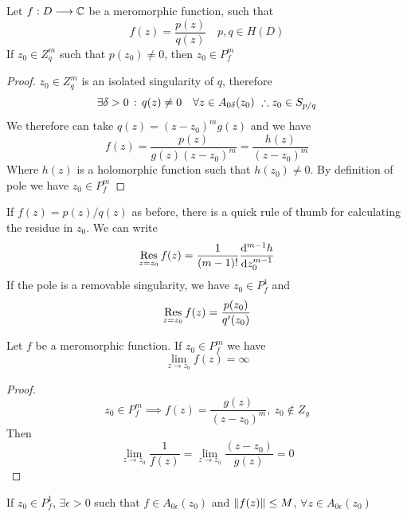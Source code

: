 \documentclass[../complete.tex]{subfiles}
\begin{document}
\begin{thm}
	Let $f:D\overset{}{\longrightarrow}\mathbb{C}$ be a meromorphic function, such that
	\begin{equation*}
		f(z)=\frac{p(z)}{q(z)}\quad p,q\in H(D)
	\end{equation*}
	If $z_0\in Z_q^m$ such that $p(z_0)\ne0$, then $z_0\in P^m_f$
\end{thm}
\begin{proof}
	$z_0\in Z_q^m$ is an isolated singularity of $q$, therefore
	\begin{equation*}
		\exists\delta>0\, :\,  q(z)\ne0\quad\forall z\in A_{0\delta}(z_0)\ \therefore z_0\in S_{p/q}
	\end{equation*}
	We therefore can take $q(z)=(z-z_0)^mg(z)$ and we have
	\begin{equation*}
		f(z)=\frac{p(z)}{g(z)(z-z_0)^m}=\frac{h(z)}{(z-z_0)^m}
	\end{equation*}
	Where $h(z)$ is a holomorphic function such that $h(z_0)\ne0$. By definition of pole we have $z_0\in P^m_f$
\end{proof}
\begin{thm}
	If $f(z)=p(z)/q(z)$ as before, there is a quick rule of thumb for calculating the residue in $z_0$. We can write
	\begin{equation*}
		\res_{z=z_0}f(z)=\frac{1}{(m-1)!}\derivative[m-1]{h}{z_0}
	\end{equation*}
	If the pole is a removable singularity, we have $z_0\in P^1_f$ and
	\begin{equation*}
		\operatorname*{\mathrm{Res}}_{z=z_0}f(z)=\frac{p(z_0)}{q'(z_0)}
	\end{equation*}
\end{thm}
\begin{thm}
	Let $f$ be a meromorphic function. If $z_0\in P^m_f$ we have
	\begin{equation*}
		\lim_{z\to z_0}f(z)=\infty
	\end{equation*}
\end{thm}
\begin{proof}
	\begin{equation*}
		z_0\in P^m_f\implies{} f(z)=\frac{g(z)}{(z-z_0)^m},\ z_0\notin Z_g
	\end{equation*}
	Then
	\begin{equation*}
		\lim_{z\to z_0}\frac{1}{f(z)}=\lim_{z\to z_0}\frac{(z-z_0)}{g(z)}=0
	\end{equation*}
\end{proof}
\begin{thm}
	If $z_0\in P^1_f$, $\exists\epsilon>0$ such that $f\in A_{0\epsilon}(z_0)$ and $\norm{f(z)}\le M$, $\forall z\in A_{0\epsilon}(z_0)$
\end{thm}
\end{document}
